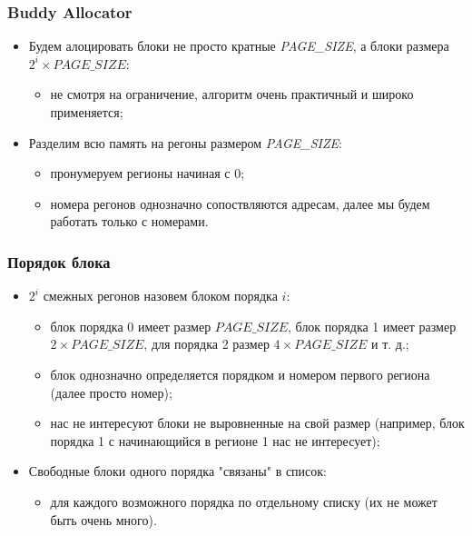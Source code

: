 \begin{frame}
\frametitle{Buddy Allocator}
\begin{itemize}
  \item Будем алоцировать блоки не просто кратные \emph{PAGE\_SIZE}, а блоки
  размера $2^i \times PAGE\_SIZE$:
  \begin{itemize}
    \item не смотря на ограничение, алгоритм очень практичный и широко
    применяется;
  \end{itemize}
  \item Разделим всю память на регоны размером \emph{PAGE\_SIZE}:
  \begin{itemize}
    \item пронумеруем регионы начиная с 0;
    \item номера регонов однозначно сопоствляются адресам, далее мы будем
    работать только с номерами.
  \end{itemize}
\end{itemize}
\end{frame}

\begin{frame}
\frametitle{Порядок блока}
\begin{itemize}
  \item $2^i$ смежных регонов назовем блоком порядка $i$:
  \begin{itemize}
    \item блок порядка 0 имеет размер $PAGE\_SIZE$, блок порядка 1 имеет размер
    $2 \times PAGE\_SIZE$, для порядка 2 размер $4 \times PAGE\_SIZE$ и т. д.;
    \item блок однозначно определяется порядком и номером первого региона (далее
    просто номер);
    \item нас не интересуют блоки не выровненные на свой размер (например, блок
    порядка 1 с начинающийся в регионе 1 нас не интересует);
  \end{itemize}
  \item Свободные блоки одного порядка "связаны" в список:
  \begin{itemize}
    \item для каждого возможного порядка по отдельному списку (их не может быть
    очень много).
  \end{itemize}
\end{itemize}
\end{frame}

